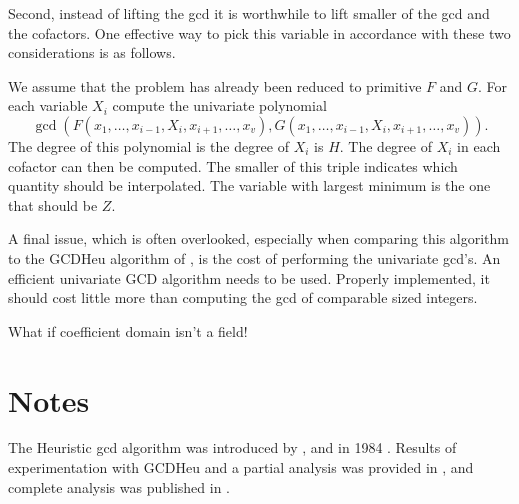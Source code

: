 Second, instead of lifting the {\sc gcd} it is worthwhile to lift
smaller of the {\sc gcd} and the cofactors.  One effective way to pick
this variable in accordance with these two considerations is as
follows.

We assume that the problem has already been reduced to primitive $F$
and $G$.  For each variable $X_i$ compute the univariate polynomial
\[
\gcd(F(x_1, \ldots, x_{i-1}, X_i, x_{i+1}, \ldots, x_v), 
     G(x_1, \ldots, x_{i-1}, X_i, x_{i+1}, \ldots, x_v)).
\]
The degree of this polynomial is the degree of $X_i$ is $H$.  The
degree of $X_i$ in each cofactor can then be computed.  The smaller of
this triple indicates which quantity should be interpolated.  The
variable with largest minimum is the one that should be $Z$.

A final issue, which is often overlooked, especially when comparing
this algorithm to the GCDHeu algorithm of
, is the cost of performing the univariate
{\sc gcd}'s.  An efficient univariate {\sc GCD} algorithm needs to be
used.  Properly implemented, it should cost little more than computing
the {\sc gcd} of comparable sized integers.

What if coefficient domain isn't a field!

\section*{Notes}

\footnotesize

 The Heuristic {\sc gcd} algorithm was
introduced by {\CharBW}, {\Geddes} and {\Gonnet} in 1984 \cite{Char84}.
Results of experimentation with GCDHeu and a partial analysis was
provided in \cite{Davenport85a}, and complete analysis was published
in \cite{Char89}.

\normalsize

